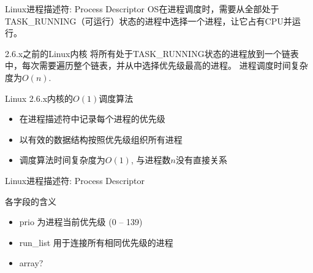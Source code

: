 \documentclass[xcolor=svgnames]{beamer}
\begin{document}
\begin{CJK*}{UTF8}{gbsn}
\begin{frame}{Linux进程描述符: Process Descriptor}
OS在进程调度时，需要从全部处于TASK\_RUNNING（可运行）状态的进程中选择一个进程，让它占有CPU并运行。
\begin{block}{2.6.x之前的Linux内核}
将所有处于TASK\_RUNNING状态的进程放到一个链表中，每次需要遍历整个链表，并从中选择优先级最高的进程。
进程调度时间复杂度为$O(n)$.
\end{block}
\begin{block}{Linux 2.6.x内核的$O(1)$调度算法}
\begin{itemize}
\item 在进程描述符中记录每个进程的优先级
\item 以有效的数据结构按照优先级组织所有进程
\item 调度算法时间复杂度为$O(1)$, 与进程数$n$没有直接关系
\end{itemize}
\end{block}
\end{frame}

\begin{frame}{Linux进程描述符: Process Descriptor}
\lstrunning
\begin{block}{各字段的含义}
\begin{itemize}
\item prio 为进程当前优先级 (0 -- 139)
\item run\_list 用于连接所有相同优先级的进程
\item array?
\end{itemize}
\end{block}
\end{frame}


\end{CJK*}
\end{document}
